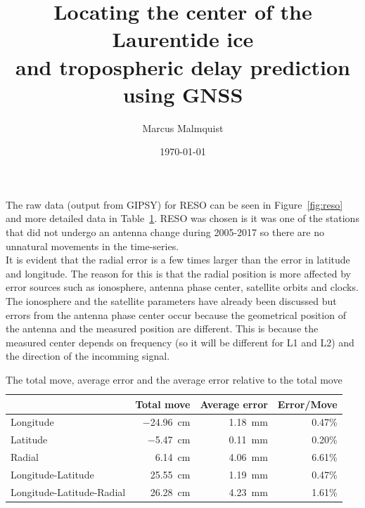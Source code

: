 \documentclass[12pt,a4paper]{article}
\title{Locating the center of the Laurentide ice\\and tropospheric delay prediction\\using GNSS}
\author{Marcus Malmquist}
\date{\today}
\begin{document}
\noindent The raw data (output from GIPSY) for RESO can be seen in Figure~\ref{fig:reso} and more detailed data in Table~\ref{tab:reso}.
RESO was chosen is it was one of the stations that did not undergo an antenna change during 2005-2017 so there are no unnatural movements in the time-series.\\

\noindent It is evident that the radial error is a few times larger than the error in latitude and longitude.
The reason for this is that the radial position is more affected by error sources such as ionosphere, antenna phase center, satellite orbits and clocks.
The ionosphere and the satellite parameters have already been discussed but errors from the antenna phase center occur because the geometrical position of the antenna and the measured position are different.
This is because the measured center depends on frequency (so it will be different for L1 and L2) and the direction of the incomming signal.
\begin{table}[!ht]
  \centering
  \caption{The total move, average error and the average error relative to the total move}
  \begin{tabular}{|l|r|r|r|} \hline
    & Total move & Average error & Error/Move \\ \hline
    Longitude & \SI{-24.96}{\centi\meter} & \SI{1.18}{\milli\meter} & 0.47\% \\ \hline
    Latitude & \SI{-5.47}{\centi\meter} & \SI{0.11}{\milli\meter} & 0.20\% \\ \hline
    Radial & \SI{6.14}{\centi\meter} & \SI{4.06}{\milli\meter} & 6.61\% \\ \hline
    Longitude-Latitude & \SI{25.55}{\centi\meter} & \SI{1.19}{\milli\meter} & 0.47\% \\ \hline
    Longitude-Latitude-Radial & \SI{26.28}{\centi\meter} & \SI{4.23}{\milli\meter} & 1.61\% \\ \hline
  \end{tabular}
  \label{tab:reso}
\end{table}
\end{document}
